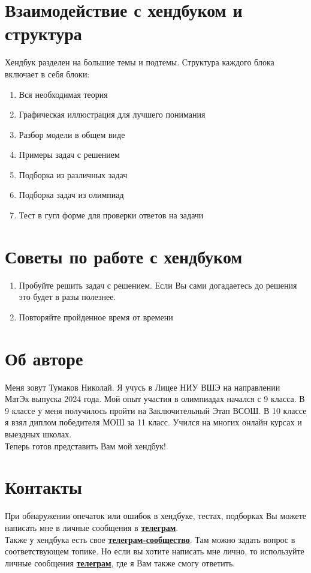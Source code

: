 \section{Взаимодействие с хендбуком и структура}
\indent\setlength{\parindent}{1em}Хендбук разделен на большие темы и подтемы. Структура каждого блока включает в себя блоки:
\begin{enumerate}
    \item Вся необходимая теория
    \item Графическая иллюстрация для лучшего понимания
    \item Разбор модели в общем виде
    \item Примеры задач с решением
    \item Подборка из различных задач
    \item Подборка задач из олимпиад
    \item Тест в гугл форме для проверки ответов на задачи
\end{enumerate}

\section{Советы по работе с хендбуком}
\begin{enumerate}
    \item Пробуйте решить задач с решением. Если Вы сами догадаетесь до решения это будет в разы полезнее.
    \item Повторяйте пройденное время от времени
\end{enumerate}

\section{Об авторе}
\indent\setlength{\parindent}{1em}Меня зовут Тумаков Николай. Я учусь в Лицее НИУ ВШЭ на направлении МатЭк выпуска 2024 года. Мой опыт участия в олимпиадах начался с 9 класса. В 9 классе у меня получилось пройти на Заключительный Этап ВСОШ. В 10 классе я взял диплом победителя МОШ за 11 класс. Учился на многих онлайн курсах и выездных школах.\smallskip\\
\indent\setlength{\parindent}{1em}Теперь готов представить Вам мой хендбук!

\section{Контакты}
\indent\setlength{\parindent}{1em}При обнаружении опечаток или ошибок в хендбуке, тестах, подборках Вы можете написать мне в личные сообщения в \textbf{\href{https://t.me/nntumakov}{телеграм}}.\smallskip\\
\indent\setlength{\parindent}{1em}Также у хендбука есть свое \textbf{\href{https://t.me/econ_handbook_screening}{телеграм-сообщество}}. Там можно задать вопрос в соответствующем топике. Но если вы хотите написать мне лично, то используйте личные сообщения \textbf{\href{https://t.me/nntumakov}{телеграм}}, где я Вам также смогу ответить.

